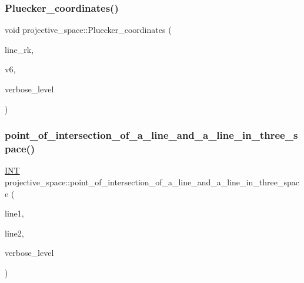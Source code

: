 \mbox{\label{classprojective__space_a3de51df7c58c1f2575bdfbd383fb171e}} 
\subsubsection{\texorpdfstring{Pluecker\+\_\+coordinates()}{Pluecker\_coordinates()}}
{\footnotesize\ttfamily void projective\+\_\+space\+::\+Pluecker\+\_\+coordinates (\begin{DoxyParamCaption}\item[{\mbox{\hyperlink{galois_8h_a09fddde158a3a20bd2dcadb609de11dc}{I\+NT}}}]{line\+\_\+rk,  }\item[{\mbox{\hyperlink{galois_8h_a09fddde158a3a20bd2dcadb609de11dc}{I\+NT}} $\ast$}]{v6,  }\item[{\mbox{\hyperlink{galois_8h_a09fddde158a3a20bd2dcadb609de11dc}{I\+NT}}}]{verbose\+\_\+level }\end{DoxyParamCaption})}

\mbox{\label{classprojective__space_a305ed998300ced29ba09ca5071160a99}} 
\subsubsection{\texorpdfstring{point\+\_\+of\+\_\+intersection\+\_\+of\+\_\+a\+\_\+line\+\_\+and\+\_\+a\+\_\+line\+\_\+in\+\_\+three\+\_\+space()}{point\_of\_intersection\_of\_a\_line\_and\_a\_line\_in\_three\_space()}}
{\footnotesize\ttfamily \mbox{\hyperlink{galois_8h_a09fddde158a3a20bd2dcadb609de11dc}{I\+NT}} projective\+\_\+space\+::point\+\_\+of\+\_\+intersection\+\_\+of\+\_\+a\+\_\+line\+\_\+and\+\_\+a\+\_\+line\+\_\+in\+\_\+three\+\_\+space (\begin{DoxyParamCaption}\item[{\mbox{\hyperlink{galois_8h_a09fddde158a3a20bd2dcadb609de11dc}{I\+NT}}}]{line1,  }\item[{\mbox{\hyperlink{galois_8h_a09fddde158a3a20bd2dcadb609de11dc}{I\+NT}}}]{line2,  }\item[{\mbox{\hyperlink{galois_8h_a09fddde158a3a20bd2dcadb609de11dc}{I\+NT}}}]{verbose\+\_\+level }\end{DoxyParamCaption})}

